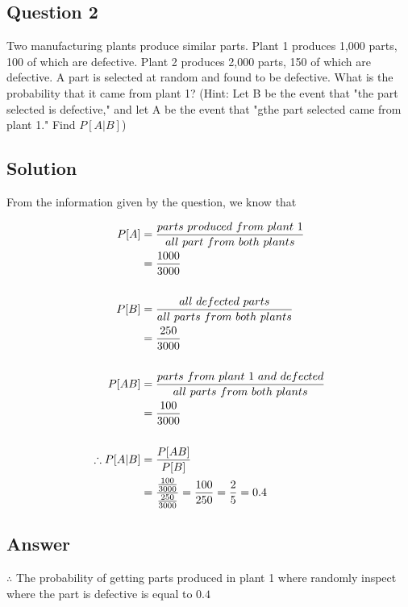 \documentclass[12pt]{report} %
\begin{document}
\newpage

\subsection*{Question 2}

Two manufacturing plants produce similar parts. Plant 1 produces 1,000
parts, 100 of which are defective. Plant 2 produces 2,000 parts, 150
of which are defective. A part is selected at random and found to be
defective. What is the probability that it came from plant 1?
(Hint: Let B be the event that "the part selected is defective," and
let A be the event that "gthe part selected came from plant 1." Find
$P[A|B]$)

\subsection*{Solution}

From the information given by the question, we know that

\begin{equation} \notag
\begin{split}
P[A] & = \frac{parts\ produced\ from\ plant\ 1}{all\ part\ from\ both\ plants} \\
& = \frac{1000}{3000} \\
\\
P[B] & = \frac{all\ defected\ parts}{all\ parts\ from\ both\ plants} \\
& = \frac{250}{3000} \\
\\
P[AB] & = \frac{parts\ from\ plant\ 1\ and\ defected}{all\ parts\ from\ both\ plants} \\
& = \frac{100}{3000} \\
\\
\therefore P[A|B] & = \frac{P[AB]}{P[B]} \\ & = \frac{\frac{100}{3000}}{\frac{250}{3000}} = \frac{100}{250} = \frac{2}{5} = 0.4
\end{split}
\end{equation}

\subsection*{Answer}
$\therefore$ The probability of getting parts produced in plant 1 where
randomly inspect where the part is defective is equal to $0.4$
\end{document}
